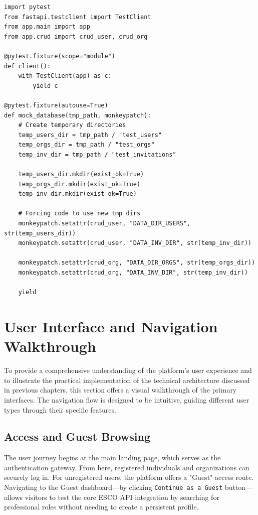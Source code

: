 \documentclass{article}
\begin{document}
\begin{lstlisting}[caption={Pytest configuration with TestClient and temporary mock databases}]
import pytest
from fastapi.testclient import TestClient
from app.main import app
from app.crud import crud_user, crud_org

@pytest.fixture(scope="module")
def client():
    with TestClient(app) as c:
        yield c

@pytest.fixture(autouse=True)
def mock_database(tmp_path, monkeypatch):
    # Create temporary directories
    temp_users_dir = tmp_path / "test_users"
    temp_orgs_dir = tmp_path / "test_orgs"
    temp_inv_dir = tmp_path / "test_invitations"
    
    temp_users_dir.mkdir(exist_ok=True)
    temp_orgs_dir.mkdir(exist_ok=True)
    temp_inv_dir.mkdir(exist_ok=True)

    # Forcing code to use new tmp dirs
    monkeypatch.setattr(crud_user, "DATA_DIR_USERS", str(temp_users_dir))
    monkeypatch.setattr(crud_user, "DATA_INV_DIR", str(temp_inv_dir))

    monkeypatch.setattr(crud_org, "DATA_DIR_ORGS", str(temp_orgs_dir))
    monkeypatch.setattr(crud_org, "DATA_INV_DIR", str(temp_inv_dir))

    yield
\end{lstlisting}

\newpage

\section{User Interface and Navigation Walkthrough}
To provide a comprehensive understanding of the platform's user experience and 
to illustrate the practical implementation of the technical architecture discussed 
in previous chapters, this section offers a visual walkthrough of the primary 
interfaces. The navigation flow is designed to be intuitive, guiding different 
user types through their specific features.

\subsection{Access and Guest Browsing}
The user journey begins at the main landing page, which serves as the 
authentication gateway. From here, registered individuals and organizations 
can securely log in. For unregistered users, the platform offers a "Guest" 
access route. Navigating to the Guest dashboard---by clicking 
\texttt{Continue as a Guest} button---allows visitors to test the 
core ESCO API integration by searching for professional roles without 
needing to create a persistent profile.
\end{document}
